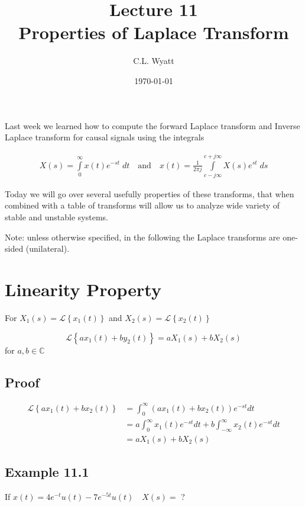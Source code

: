\documentclass{article}
\begin{document}
\title{Lecture 11\\ Properties of Laplace Transform}
\author{C.L. Wyatt}
\date{\today}
\maketitle

Last week we learned how to compute the forward Laplace transform and Inverse Laplace transform for causal signals using the integrals


$$
\begin{aligned}
X(s)=\int\limits_{0}^{\infty} x(t) e^{-s t}\; dt \quad\text{and}\quad x(t)=\frac{1}{2 \pi j} \int\limits_{c- j \infty}^{c+j \infty} X(s) e^{s t}\; ds
\end{aligned}
$$

Today we will go over several usefully properties of these transforms, that when combined with a table of transforms will allow us to analyze wide variety of stable and unstable systems.

Note: unless otherwise specified, in the following the Laplace transforms are one-sided (unilateral).

\section{Linearity Property}

For $X_{1}(s)=\mathcal{L}\left\{x_{1}(t)\right\}$ and $X_{2}(s)=\mathcal{L}\left\{x_{2}(t)\right\}$

$$
\mathcal{L}\left\{a x_{1}(t)+b y_{2}(t)\right\}=a X_{1}(s)+b X_{2}(s)
$$
for $a, b \in \mathbb{C}$

\subsection{Proof}

$$
\begin{aligned}
\mathcal{L}\left\{a x_{1}(t)+b x_{2}(t)\right\} & =\int_{0}^{\infty}\left(a x_{1}(t)+b x_{2}(t)\right) e^{-s t} d t \\
& =a \int_{0}^{\infty} x_{1}(t) e^{-s t} d t+b \int_{-\infty}^{\infty} x_{2}(t) e^{-s t} d t \\
& =a X_{1}(s)+b X_{2}(s)
\end{aligned}
$$

\subsection{Example 11.1}
If $x(t)=4 e^{-t} u(t)-7 e^{-5 t} u(t) \quad X(s)=$ ?
\end{document}
